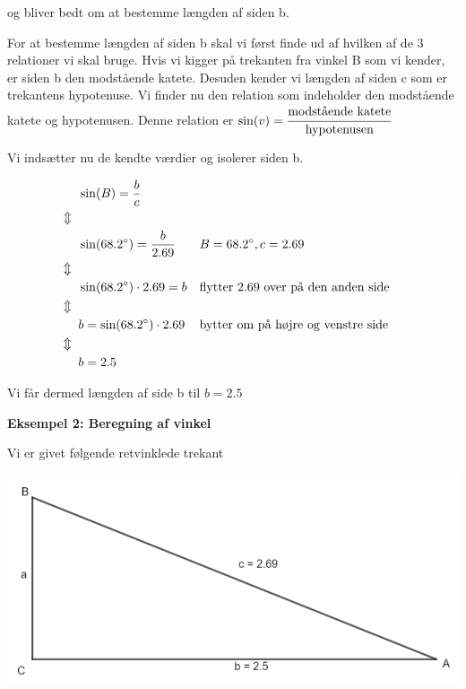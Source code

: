 og bliver bedt om at bestemme længden af siden b.

For at bestemme længden af siden b skal vi først finde ud af hvilken af de 3 relationer vi skal bruge. Hvis vi kigger på trekanten fra vinkel B som vi kender, er siden b den modstående katete. Desuden kender vi længden af siden c som er trekantens hypotenuse. Vi finder nu den relation som indeholder den modstående katete og hypotenusen. Denne relation er $\sin(v) = \cfrac{\text{modstående katete}}{\text{hypotenusen}} $

Vi indsætter nu de kendte værdier og isolerer siden b.

\begin{align*}
&\sin(B) = \frac{b}{c}\\
\Updownarrow \hspace*{2mm} &\\
&\sin(68.2^{\circ}) = \frac{b}{2.69} && B = 68.2^{\circ}, c = 2.69\\
\Updownarrow \hspace*{2mm} &\\
&\sin(68.2^{\circ}) \cdot 2.69 = b && \text{flytter 2.69 over på den anden side} \\
\Updownarrow \hspace*{2mm} &\\
&b = \sin(68.2^{\circ}) \cdot 2.69 && \text{bytter om på højre og venstre side}\\
\Updownarrow \hspace*{2mm} &\\
&b = 2.5
\end{align*}

Vi får dermed længden af side b til $b = 2.5$

\textbf{Eksempel 2: Beregning af vinkel}

Vi er givet følgende retvinklede trekant

\includegraphics[scale=0.7]{img_2}

